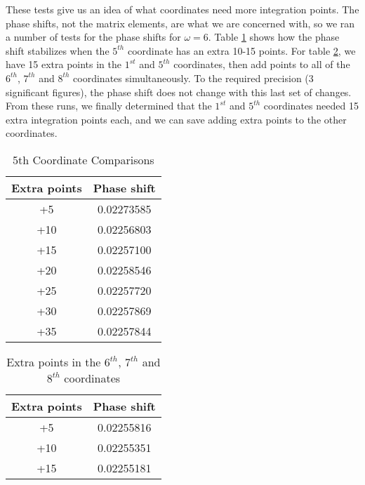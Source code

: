 \documentclass[Dissertation.tex]{subfiles}
\begin{document}
These tests give us an idea of what coordinates need more integration points. The phase shifts, not the matrix elements, are what we are concerned with, so we ran a number of tests for the phase shifts for $\omega = 6$. Table \ref{tab:5thcoordExtraPoints} shows how the phase shift stabilizes when the $5^{th}$ coordinate has an extra 10-15 points. For table \ref{tab:678thcoordExtraPoints}, we have 15 extra points in the $1^{st}$ and $5^{th}$ coordinates, then add points to all of the $6^{th}$, $7^{th}$ and $8^{th}$ coordinates simultaneously. To the required precision (3 significant figures), the phase shift does not change with this last set of changes. From these runs, we finally determined that the $1^{st}$ and $5^{th}$ coordinates needed 15 extra integration points each, and we can save adding extra points to the other coordinates.

\begin{table}[H]
\begin{center}
\begin{tabular}{c c}
\toprule
Extra points & Phase shift \\
\midrule
+5 & 0.02273585 \\
+10 & 0.02256803 \\
+15 & 0.02257100 \\
+20 & 0.02258546 \\
+25 & 0.02257720 \\
+30 & 0.02257869 \\
+35 & 0.02257844 \\
\bottomrule
\end{tabular}
\caption{5th Coordinate Comparisons}
\label{tab:5thcoordExtraPoints}
\end{center}
\end{table}


\begin{table}[H]
\begin{center}
\begin{tabular}{c c}
\toprule
Extra points & Phase shift \\
\midrule
+5 & 0.02255816 \\
+10 & 0.02255351 \\
+15 & 0.02255181 \\
\bottomrule
\end{tabular}
\caption{Extra points in the $6^{th}$, $7^{th}$ and $8^{th}$ coordinates}
\label{tab:678thcoordExtraPoints}
\end{center}
\end{table}
\end{document}
